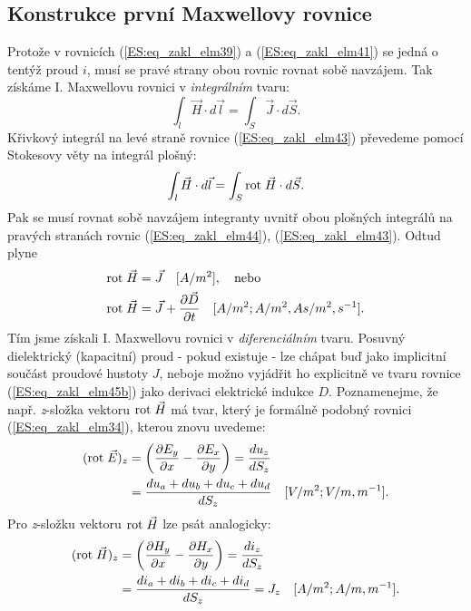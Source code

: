     \subsection{Konstrukce první Maxwellovy rovnice}
      Protože v rovnicích (\ref{ES:eq_zakl_elm39}) a (\ref{ES:eq_zakl_elm41}) se jedná o tentýž 
      proud \(i\), musí se pravé strany obou rovnic rovnat sobě navzájem. Tak získáme I. 
      Maxwellovu rovnici v \emph{integrálním} tvaru:
      \begin{equation}\label{ES:eq_zakl_elm43}
        \int_l \vec{H}\cdot d\vec{l} = \int_S \vec{J}\cdot d\vec{S}.
      \end{equation} 
      Křivkový integrál na levé straně rovnice (\ref{ES:eq_zakl_elm43}) převedeme pomocí Stokesovy 
      věty na integrál plošný:	
      \begin{equation}\label{ES:eq_zakl_elm44}
        \int_l \vec{H}\cdot d\vec{l} = \int_S \mathrm{rot}\;\vec{H}\cdot d\vec{S}.
      \end{equation} 
      Pak se musí rovnat sobě navzájem integranty uvnitř obou plošných integrálů na pravých 
      stranách rovnic (\ref{ES:eq_zakl_elm44}), (\ref{ES:eq_zakl_elm43}). Odtud plyne
      \begin{subequations}
        \begin{align}
          \mathrm{rot}\;\vec{H} &= \vec{J} \quad [A/m^2], \quad\text{nebo}      \label{ES:eq_zakl_elm45a} \\
          \mathrm{rot}\;\vec{H} &= \vec{J} + \dfrac{\partial \vec{D}}{\partial t} 
                     \quad [A/m^2; A/m^2, As/m^2, s^{-1}].        \label{ES:eq_zakl_elm45b}
        \end{align}
      \end{subequations}
      Tím jsme získali I. Maxwellovu rovnici v \emph{diferenciálním} tvaru. Posuvný dielektrický 
      (kapacitní) proud - pokud existuje - lze chápat buď jako implicitní součást proudové hustoty 
      \(J\), neboje možno vyjádřit ho explicitně ve tvaru rovnice (\ref{ES:eq_zakl_elm45b}) 
      jako derivaci elektrické indukce \(D\). Poznamenejme, že např. \emph{z}-složka vektoru 
      \(\mathrm{rot}\;\vec{H}\) má tvar, který je formálně podobný rovnici (\ref{ES:eq_zakl_elm34}), kterou 
      znovu uvedeme:
      \begin{align*}
         (\mathrm{rot}\;\vec{E})_z &= \left(\dfrac{\partial E_y}{\partial x} - \dfrac{\partial E_x}{\partial y}\right)
                      = \frac{du_z}{dS_z}                                                  \\
                     &= \frac{du_a + du_b + du_c + du_d}{dS_z} \quad[V/m^2; V/m, m^{-1}].
      \end{align*}
      Pro \emph{z}-složku vektoru \(\mathrm{rot}\;\vec{H}\) lze psát analogicky:
      \begin{align*}
        (\mathrm{rot}\;\vec{H})_z &= \left(\dfrac{\partial H_y}{\partial x} - \dfrac{\partial H_x}{\partial y}\right)
                     = \frac{di_z}{dS_z}                                                   \\
                    &= \frac{di_a + di_b + di_c + di_d}{dS_z} = J_z \quad[A/m^2; A/m, m^{-1}].
      \end{align*}
      
